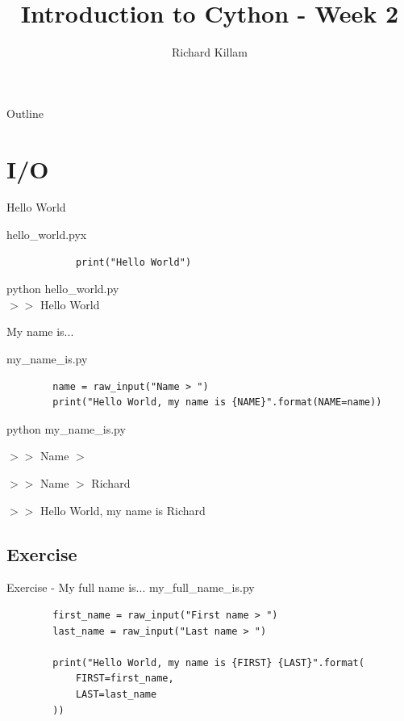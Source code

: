 \documentclass[11pt]{beamer}
\author{Richard Killam}
\title{Introduction to Cython - Week 2}
\newcommand{\emptyline}{$ $\\}
\begin{document}
\centering

\begin{frame}
	\titlepage
\end{frame}

\begin{frame}{Outline}
	\begin{multicols}{2}
		\tableofcontents
	\end{multicols}
\end{frame}

\section{I/O}
\begin{frame}[fragile]{Hello World}
	\begin{minipage}{0.45\linewidth}
		hello\_world.pyx
		\begin{lstlisting}
			print("Hello World")
		\end{lstlisting}
	\end{minipage}
	\pause
	\begin{minipage}{0.45\linewidth}
		python hello\_world.py
		\emptyline
		$>>$ Hello World
	\end{minipage}
\end{frame}

\begin{frame}[fragile]{My name is...}
	\raggedright
	my\_name\_is.py
	\begin{lstlisting}
		name = raw_input("Name > ")
		print("Hello World, my name is {NAME}".format(NAME=name))
	\end{lstlisting}

	\pause
	
	python my\_name\_is.py
	
	$>>$ Name $>$ 
	
	$>>$ Name $>$ Richard
	
	$>>$ Hello World, my name is Richard
	
\end{frame}

\subsection{Exercise}
\begin{frame}[fragile]{Exercise - My full name is...}
	\pause
	my\_full\_name\_is.py
	\begin{lstlisting}
		first_name = raw_input("First name > ")
		last_name = raw_input("Last name > ")
		
		print("Hello World, my name is {FIRST} {LAST}".format(
		    FIRST=first_name, 
		    LAST=last_name
		))
	\end{lstlisting}
\end{frame}
\end{document}

